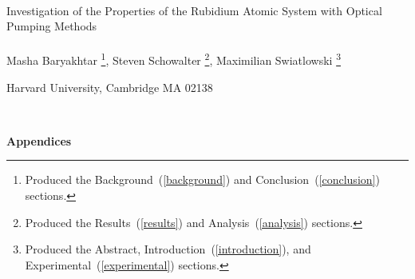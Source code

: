 \documentclass[12pt,notitlepage]{article}
\begin{document}


\begin{titlepage}
\begin{center}

\ \\
\vspace{1in}

{\Huge Investigation of the Properties of the Rubidium Atomic System with Optical Pumping Methods \\}
\ \\



\large{Masha Baryakhtar \footnote{Produced the Background~(\ref{background}) and Conclusion~(\ref{conclusion}) sections.}, Steven Schowalter \footnote{Produced the Results~(\ref{results}) and Analysis~(\ref{analysis}) sections.}, Maximilian Swiatlowski \footnote{Produced the Abstract, Introduction~(\ref{introduction}), and Experimental~(\ref{experimental}) sections.}}

\small{Harvard University, Cambridge MA 02138}

\ \\




\end{center}
\end{titlepage}

\clearpage














\appendix



\begin{center}
\begin{Large}
\bfseries{Appendices}
\end{Large}
\end{center}



\newpage


\end{document}
